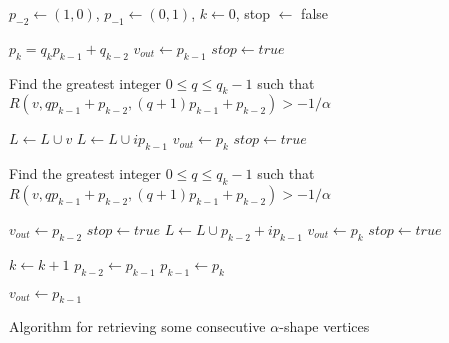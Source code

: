 \documentclass{article}
\begin{document}
\begin{algorithm}[h]
  $p_{-2} \leftarrow (1,0)$, $p_{-1} \leftarrow (0,1)$, $k \leftarrow 0$, stop $\leftarrow$ false \;
  {
    $p_k = q_k p_{k-1} + q_{k-2}$ \;
    {
      {
        $v_{out} \leftarrow p_{k-1}$ \;
        $stop\leftarrow true$ \;
      }
    }
    {
      {
        {
          Find the greatest integer $0 \leq q \leq q_{k} - 1$ such that 
          $R(v, qp_{k-1} + p_{k-2}, (q+1)p_{k-1} + p_{k-2}) > -1/\alpha$ \;
          
          $L \leftarrow L \cup v$ \; 
          {
            $L \leftarrow L \cup i p_{k-1} $ \;      
          }
          $v_{out} \leftarrow p_{k}$ \;
          $stop \leftarrow true$ \;
        }          
      }  
      {
        {
          Find the greatest integer $0 \leq q \leq q_{k} - 1$ such that 
          $R(v, qp_{k-1} + p_{k-2}, (q+1)p_{k-1} + p_{k-2}) > -1/\alpha$ \;
        
          {
            $v_{out} \leftarrow p_{k-2}$ \;
            $stop \leftarrow true$ \;
          }
          {
            {
              $L \leftarrow L \cup p_{k-2} + i p_{k-1} $ \;      
            }
            $v_{out} \leftarrow p_{k}$ \;
            $stop \leftarrow true$ \;
          }  
        }
      } 
    }
    $k \leftarrow k + 1$ \;
    $p_{k-2} \leftarrow p_{k-1}$ \;
    $p_{k-1} \leftarrow p_{k}$ \;
   }
   {
    $v_{out} \leftarrow p_{k-1}$ \; 
   } 

  \caption{Algorithm for retrieving some consecutive $\alpha$-shape vertices}
  \label{algo:1}

\end{algorithm}
\end{document}
